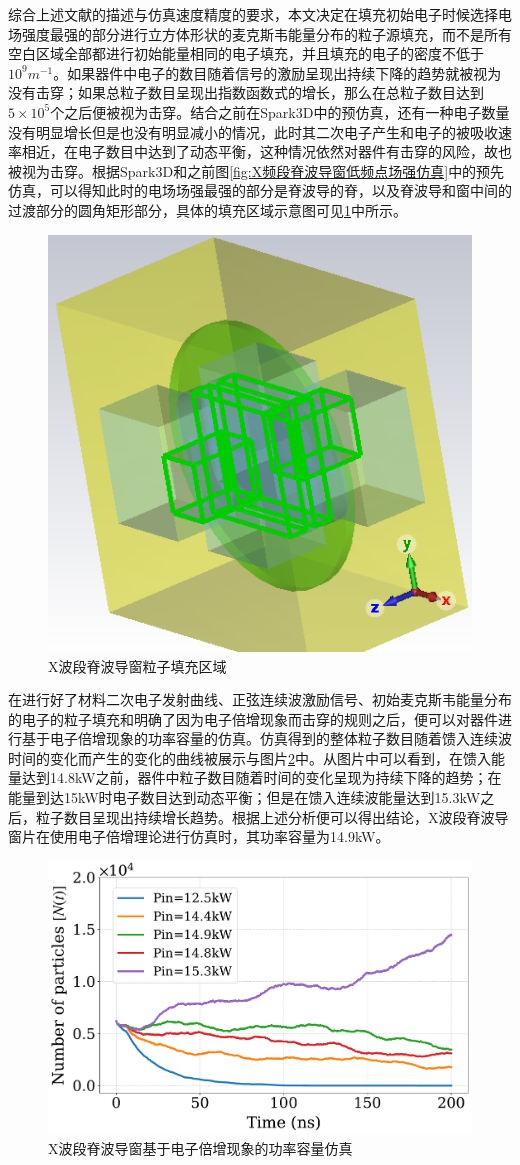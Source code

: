 \documentclass[master]{thesis-uestc}
\begin{document}
综合上述文献的描述与仿真速度精度的要求，本文决定在填充初始电子时候选择电场强度最强的部分进行立方体形状的麦克斯韦能量分布的粒子源填充，而不是所有空白区域全部都进行初始能量相同的电子填充，并且填充的电子的密度不低于$10^9 m^{-1}$。如果器件中电子的数目随着信号的激励呈现出持续下降的趋势就被视为没有击穿；如果总粒子数目呈现出指数函数式的增长，那么在总粒子数目达到$5 \times 10^5$个之后便被视为击穿。结合之前在Spark3D中的预仿真，还有一种电子数量没有明显增长但是也没有明显减小的情况，此时其二次电子产生和电子的被吸收速率相近，在电子数目中达到了动态平衡，这种情况依然对器件有击穿的风险，故也被视为击穿。根据Spark3D和之前图\ref{fig:X频段脊波导窗低频点场强仿真}中的预先仿真，可以得知此时的电场场强最强的部分是脊波导的脊，以及脊波导和窗中间的过渡部分的圆角矩形部分，具体的填充区域示意图可见\ref{fig:X粒子填充区域}中所示。
\begin{figure}[!htb]
    \centering
    \includegraphics[width=0.25\linewidth]{pic/chapter3/粒子填充区域斜视图.png}
    \caption{X波段脊波导窗粒子填充区域}
    \label{fig:X粒子填充区域}
\end{figure}

在进行好了材料二次电子发射曲线、正弦连续波激励信号、初始麦克斯韦能量分布的电子的粒子填充和明确了因为电子倍增现象而击穿的规则之后，便可以对器件进行基于电子倍增现象的功率容量的仿真。仿真得到的整体粒子数目随着馈入连续波时间的变化而产生的变化的曲线被展示与图片\ref{fig:X波段脊波导窗基于电子倍增现象的功率容量仿真}中。从图片中可以看到，在馈入能量达到14.8kW之前，器件中粒子数目随着时间的变化呈现为持续下降的趋势；在能量到达15kW时电子数目达到动态平衡；但是在馈入连续波能量达到15.3kW之后，粒子数目呈现出持续增长趋势。根据上述分析便可以得出结论，X波段脊波导窗片在使用电子倍增理论进行仿真时，其功率容量为14.9kW。
\begin{figure}[!htb]
    \centering
    \includegraphics[width=0.5\linewidth]{pic/chapter3/particle_time_chapter3.pdf}
    \caption{X波段脊波导窗基于电子倍增现象的功率容量仿真}
    \label{fig:X波段脊波导窗基于电子倍增现象的功率容量仿真}
\end{figure}
\end{document}
